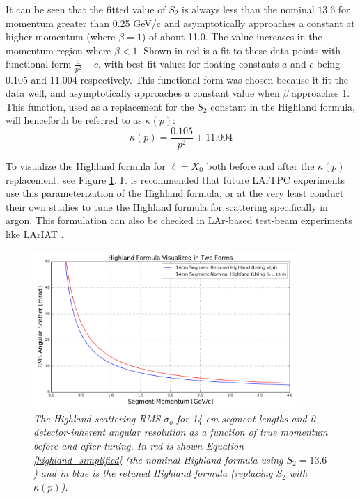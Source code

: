\documentclass[a4paper,11pt]{article}
\begin{document}
It can be seen that the fitted value of $S_2$ is always less than the nominal $13.6$ for momentum greater than 0.25 GeV/c and asymptotically approaches a constant at higher momentum (where $\beta = 1$) of about 11.0. The value increases in the momentum region where $\beta < 1$. Shown in red is a fit to these data points with functional form $\frac{a}{p^2} + c$, with best fit values for floating constants $a$ and $c$ being $0.105$ and $11.004$ respectively. This functional form was chosen because it fit the data well, and asymptotically approaches a constant value when $\beta$ approaches 1. This function, used as a replacement for the $S_2$ constant in the Highland formula, will henceforth be referred to as $\kappa(p)$:
\begin{equation}\label{kappa_equation}
\kappa(p) = \frac{0.105}{p^2} + 11.004
\end{equation}

To visualize the Highland formula for ${\ell} = X_0$ both before and after the $\kappa(p)$ replacement, see Figure \ref{retune_highland_fig2}. It is recommended that future LArTPC experiments use this parameterization of the Highland formula, or at the very least conduct their own studies to tune the Highland formula for scattering specifically in argon. This formulation can also be checked in LAr-based test-beam experiments like LArIAT \cite{LARIAT_citation}.\\

\begin{figure}[ht!]
\begin{center}
\includegraphics[width=100mm]{Figures/highland_formula_visualized_twoforms.png}
\end{center}
\caption{\textit{The Highland scattering RMS $\sigma_o$ for 14 cm segment lengths and 0 detector-inherent angular resolution as a function of true momentum before and after tuning. In red is shown Equation \ref{highland_simplified} (the nominal Highland formula using $S_2 = 13.6$) and in blue is the retuned Highland formula (replacing $S_2$ with $\kappa(p)$).}}
\label{retune_highland_fig2}
\end{figure}
\end{document}
